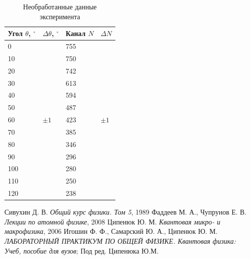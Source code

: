 \documentclass[a4paper]{article}
\begin{document}
	\begin{table}[h]
		\centering
		\begin{tabular}{|l|l|l|l|}
			\hline
			Угол $\theta$, $^\circ$ & $\Delta \theta$, $^\circ$ & Канал $N$ & $\Delta N$                \\ \hline
			0                       & \multirow{13}{*}{$\pm 1$} & 755       & \multirow{13}{*}{$\pm 1$} \\ \cline{1-1} \cline{3-3}
			10                      &                           & 750       &                           \\ \cline{1-1} \cline{3-3}
			20                      &                           & 742       &                           \\ \cline{1-1} \cline{3-3}
			30                      &                           & 613       &                           \\ \cline{1-1} \cline{3-3}
			40                      &                           & 594       &                           \\ \cline{1-1} \cline{3-3}
			50                      &                           & 487       &                           \\ \cline{1-1} \cline{3-3}
			60                      &                           & 423       &                           \\ \cline{1-1} \cline{3-3}
			70                      &                           & 385       &                           \\ \cline{1-1} \cline{3-3}
			80                      &                           & 346       &                           \\ \cline{1-1} \cline{3-3}
			90                      &                           & 296       &                           \\ \cline{1-1} \cline{3-3}
			100                     &                           & 280       &                           \\ \cline{1-1} \cline{3-3}
			110                     &                           & 250       &                           \\ \cline{1-1} \cline{3-3}
			120                     &                           & 238       &                           \\ \hline
		\end{tabular}
		\caption{Необработанные данные эксперимента}
		\label{tab:raw}
	\end{table}
		

	\begin{thebibliography}{3}
		 Сивухин Д. В. \emph{Общий курс физики. Том 5}, 1989
		 Фаддеев М. А., Чупрунов Е. В. \emph{Лекции по атомной физике}, 2008
		 Ципенюк Ю. М. \emph{Квантовая микро- и макрофизика}, 2006
		 Игошин Ф. Ф., Самарский Ю. А., Ципенюк Ю. М. \emph{ЛАБОРАТОРНЫЙ ПРАКТИКУМ ПО ОБЩЕЙ ФИЗИКЕ. Квантовая физика: Учеб, пособие для вузов}; Под ред. Ципенюка Ю.М.
	\end{thebibliography}
\end{document}
